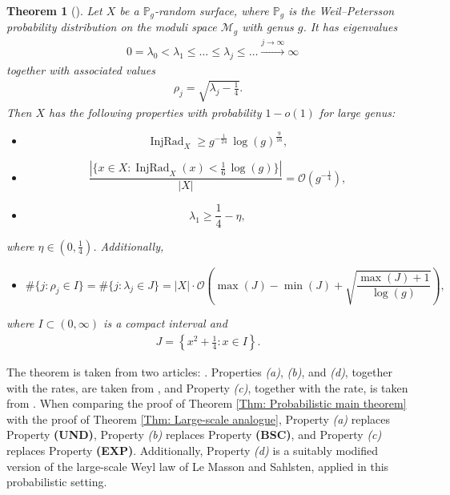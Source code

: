 \documentclass[11pt,twoside,reqno]{amsart} \usepackage{a4wide} \usepackage[T1]{fontenc} \usepackage[utf8]{inputenc} \usepackage{soul}  \usepackage{amsmath} \usepackage{amsfonts} \usepackage{amssymb} \usepackage{mathtools} \usepackage{amsthm} \usepackage{xcolor} \usepackage{graphicx} \usepackage{hyperref} \usepackage{standalone} \usepackage{esint} \usepackage{comment} \usepackage[left=2.3cm,top=3cm,right=2.3cm]{geometry} \usepackage{bm} \usepackage{svg} \usepackage{float} \numberwithin{equation}{section} \theoremstyle{plain} \newtheorem{thm}{Theorem}[section] \newtheorem{theorem}[thm]{Theorem} \newtheorem*{theorem*}{Theorem}\newtheorem{conj}[thm]{Conjecture} \newtheorem{lemma}[thm]{Lemma} \newtheorem{prop}[thm]{Proposition} \newtheorem{proposition}[thm]{Proposition} \newtheorem{cor}[thm]{Corollary} \newtheorem{question}[thm]{Question} \newtheorem{corollary}[thm]{Corollary} \newtheorem{assumption}[thm]{Assumption} \theoremstyle{definition} \newtheorem{defn}[thm]{Definition} \newtheorem{choice}[thm]{Choice} \newtheorem{definition}[thm]{Definition} \newtheorem{ex}[thm]{Example} \newtheorem{notation}[thm]{Notation} \newtheorem*{ack}{Acknowledgements} \theoremstyle{remark} \newtheorem{remark}[thm]{Remark} \newtheorem{bigremark}[thm]{Remark} \usepackage{xcolor} \newcommand{\red}[1]{ {\color{Red}#1} } \newcommand{\blue}[1]{ {\color{Blue}#1} } \author{Kai Hippi} \address{Aalto University, Espoo, Finland} \email{kai.hippi@aalto.fi}
\begin{document}
\begin{theorem}[]
	\label{Thm: Random surface theory}
	Let $ X $ be a $ \mathbb{P}_{g} $-random surface, where $ \mathbb{P}_{g} $ is the Weil--Petersson probability distribution on the moduli space $ \mathcal{M}_{g} $ with genus $ g $. It has eigenvalues
\begin{align*}
	&
	0 = \lambda_{0} < \lambda_{1}  \leq  \dots \leq \lambda_{j} \leq \dots \xrightarrow{j \to \infty} \infty
\end{align*}
together with associated values
\begin{align*}
	\rho_{j} = \sqrt{ \lambda_{j} - \tfrac{1}{4} }.
\end{align*}
Then $ X $ has the following properties with probability $ 1 - o( 1 )  $ for large genus:
\begin{itemize}
	\item [(a)] $$ \operatorname{InjRad}_{X} \geq g^{ - \frac{1}{24} } \, \log( g )^{ \frac{9}{16} } ,$$
	\item [(b)] $$  \frac{ | \{ x \in X : \operatorname{InjRad}_{X}( x ) < \frac{1}{6} \, \log( g ) \} | }{| X |} = \mathcal{O}( g^{-\frac{1}{4}} ) ,$$
	\item [(c)] $$ \lambda_{1} \geq \frac{1}{4} -  \eta ,$$
\end{itemize}
where $ \eta \in ( 0,\frac{1}{4} ) $. Additionally,
\begin{itemize}
	\item [(d)] $$ \# \{ j : \rho_{j} \in I \} = \# \{ j : \lambda_{j} \in J \} = | X | \cdot \mathcal{O} \left( \max( J ) - \min( J ) + \sqrt{ \frac{ \max( J ) + 1 }{ \log( g ) } } \right) ,$$
\end{itemize}
where $ I \subset ( 0,\infty ) $ is a compact interval and
\begin{align*}
	J = \left \{ x^{2} + \tfrac{1}{4} : x \in I \right \}.
\end{align*}

\end{theorem}
The theorem is taken from two articles: \cite{Mon22, HMT25}. Properties \emph{(a)}, \emph{(b)}, and \emph{(d)}, together with the rates, are taken from \cite{Mon22}, and Property \emph{(c)}, together with the rate, is taken from \cite{HMT25}. When comparing the proof of Theorem \ref{Thm: Probabilistic main theorem} with the proof of Theorem \ref{Thm: Large-scale analogue}, Property \emph{(a)} replaces Property \textbf{(UND)}, Property \emph{(b)} replaces Property \textbf{(BSC)}, and Property \emph{(c)} replaces Property \textbf{(EXP)}. Additionally, Property \emph{(d)} is a suitably modified version of the large-scale Weyl law of Le Masson and Sahlsten, applied in this probabilistic setting.
\end{document}
